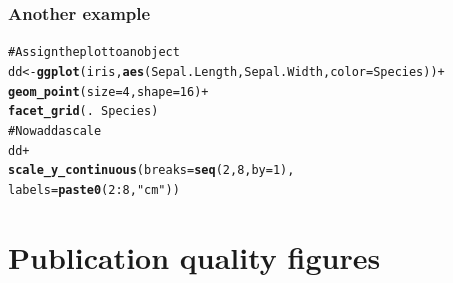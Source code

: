 \documentclass{beamer}\usepackage{graphicx, color}
\makeatletter
\newcommand{\hlfunctioncall}[1]{\textcolor[rgb]{0.501960784313725,0,0.329411764705882}{\textbf{#1}}}%
\newcommand{\hlstring}[1]{\textcolor[rgb]{0.6,0.6,1}{#1}}%
\newcommand{\hlcomment}[1]{\textcolor[rgb]{0.180392156862745,0.6,0.341176470588235}{#1}}%
\newenvironment{kframe}{%
 \def\at@end@of@kframe{}%
 \ifinner\ifhmode%
  \def\at@end@of@kframe{\end{minipage}}%
  \begin{minipage}{\columnwidth}%
 \fi\fi%
 \def\FrameCommand##1{\hskip\@totalleftmargin \hskip-\fboxsep
 \colorbox{shadecolor}{##1}\hskip-\fboxsep
     \hskip-\linewidth \hskip-\@totalleftmargin \hskip\columnwidth}%
 \MakeFramed {\advance\hsize-\width
   \@totalleftmargin\z@ \linewidth\hsize
   \@setminipage}}%
 {\par\unskip\endMakeFramed%
 \at@end@of@kframe}
\newenvironment{knitrout}{}{} %
\makeatother
\begin{document}
\begin{frame}[fragile]
\frametitle{Another example}
\begin{knitrout}\footnotesize
{}\color{fgcolor}\begin{kframe}
\begin{alltt}
\hlcomment{# Assign the plot to an object}
dd <- \hlfunctioncall{ggplot}(iris, \hlfunctioncall{aes}(Sepal.Length, Sepal.Width, color = Species)) +
\hlfunctioncall{geom_point}(size = 4, shape = 16) +
\hlfunctioncall{facet_grid}(. ~Species)
\hlcomment{# Now add a scale}
dd +
\hlfunctioncall{scale_y_continuous}(breaks = \hlfunctioncall{seq}(2, 8, by = 1),
labels = \hlfunctioncall{paste0}(2:8, \hlstring{" cm"}))
\end{alltt}
\end{kframe}
\end{knitrout}

\end{frame}



\section*{Publication quality figures}
\frame{\sectionpage}
\end{document}
